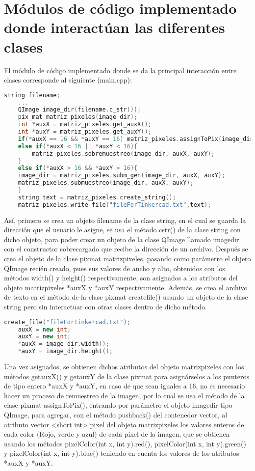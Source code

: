 \documentclass{article}
\begin{document}
\section{Módulos de código implementado donde interactúan las diferentes clases}
El módulo de código implementado donde se da la principal interacción entre clases corresponde al siguiente (main.cpp):
\begin{lstlisting}[language=C++, label=main_interaccion]
    string filename;
    ...
    QImage image_dir(filename.c_str());
    pix_mat matriz_pixeles(image_dir);
    int *auxX = matriz_pixeles.get_auxX();
    int *auxY = matriz_pixeles.get_auxY();
    if(*auxX == 16 && *auxY == 16) matriz_pixeles.assignToPix(image_dir);
    else if(*auxX < 16 || *auxY < 16){
        matriz_pixeles.sobremuestreo(image_dir, auxX, auxY);
    }
    else if(*auxX > 16 && *auxY > 16){
    image_dir = matriz_pixeles.subm_gen(image_dir, auxX, auxY);
    matriz_pixeles.submuestreo(image_dir, auxX, auxY);
    }
    string text = matriz_pixeles.create_string();
    matriz_pixeles.write_file("fileForTinkercad.txt",text);
\end{lstlisting}
Así, primero se crea un objeto filename de la clase string, en el cual se guarda la dirección que el usuario le asigne, se usa el método cstr() de la clase string con dicho objeto, para poder crear un objeto de la clase QImage llamado imagedir con el constructor sobrecargado que recibe la dirección de un archivo. Después se crea el objeto de la clase pixmat matrizpixeles, pasando como parámetro el objeto QImage recién creado, pues sus valores de ancho y alto, obtenidos con los métodos width() y height() respectivamente, son asignados a los atributos del objeto matrizpixeles *auxX y *auxY respectivamente. Además, se crea el archivo de texto en el método de la clase pixmat createfile() usando un objeto de la clase string pero sin interactuar con otras clases dentro de dicho método.
\begin{lstlisting}[language=C++, label=asignar_atributospixmat]
    create_file("fileForTinkercad.txt");
    auxX = new int;
    auxY = new int;
    *auxX = image_dir.width();
    *auxY = image_dir.height();
\end{lstlisting}
Una vez asignados, se obtienen dichos atributos del objeto matrizpixeles con los métodos getauxX() y getauxY de la clase pixmat para asignárselos a los punteros de tipo entero *auxX y *auxY, en caso de que sean iguales a 16, no es necesario hacer un proceso de remuestreo de la imagen, por lo cual se usa el método de la clase pixmat assignToPix(), entrando por parámetro el objeto imagedir tipo QImage, para agregar, con el método pushback() del contenedor vector, al atributo vector <short int> pixel del objeto matrizpixeles los valores enteros de cada color (Rojo, verde y azul) de cada pixel de la imagen, que se obtienen usando los métodos pixelColor(int x, int y).red(), pixelColor(int x, int y).green() y pixelColor(int x, int y).blue() teniendo en cuenta los valores de los atributos *auxX y *auxY.
\end{document}
